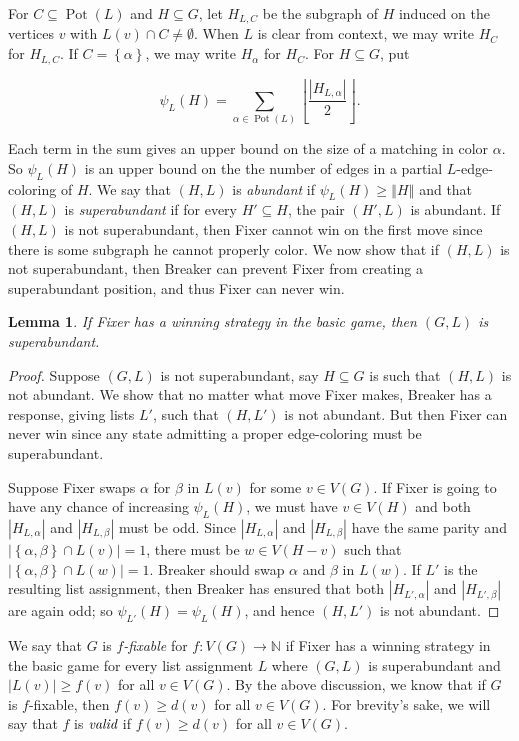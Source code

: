 \documentclass[12pt,reqno]{amsart}
\theoremstyle{plain}
\newtheorem{lem}[thm]{Lemma}
\theoremstyle{definition}
\theoremstyle{remark}
\newcommand{\IN}{\mathbb{N}}
\newcommand{\set}[1]{\left\{ #1 \right\}}
\newcommand{\card}[1]{\left|#1\right|}
\newcommand{\size}[1]{\left\Vert#1\right\Vert}
\newcommand{\floor}[1]{\left\lfloor#1\right\rfloor}
\newcommand{\func}[3]{#1\colon #2 \rightarrow #3}
\newcommand{\pot}{\operatorname{Pot}}
\begin{document}
\bigskip
\noindent 
For $C \subseteq \pot(L)$ and $H \subseteq G$, let $H_{L, C}$ be the
subgraph of $H$ induced on the vertices $v$ with $L(v) \cap C \ne \emptyset$. 
When $L$ is clear from context, we may write $H_C$ for $H_{L,C}$. If $C =
\set{\alpha}$, we may write $H_\alpha$ for $H_C$.  For $H \subseteq G$, put

\[\psi_L(H) = \sum_{\alpha \in \pot(L)} \floor{\frac{\card{H_{L, \alpha}}}{2}}.\]

Each term in the sum gives an upper bound on the size of a matching in color
$\alpha$. So $\psi_L(H)$ is an upper bound on the the number of edges in a
partial $L$-edge-coloring of $H$.  We say that $(H, L)$ is \emph{abundant} if
$\psi_L(H) \ge \size{H}$ and that $(H,L)$ is \emph{superabundant} if for every
$H' \subseteq H$, the pair $(H', L)$ is abundant.  If $(H, L)$ is not
superabundant, then Fixer cannot win on the first move since there is some
subgraph he cannot properly color.  We now show that if $(H, L)$ is not
superabundant, then Breaker can prevent Fixer from creating a superabundant
position, and thus Fixer can never win.

\begin{lem}\label{Necessity}
If Fixer has a winning strategy in the basic game, then $(G, L)$ is superabundant.
\end{lem}
\begin{proof}
Suppose $(G, L)$ is not superabundant, say $H \subseteq G$ is such that $(H,
L)$ is not abundant.  We show that no matter what move Fixer makes, Breaker has
a response, giving lists $L'$, such that $(H, L')$ is not abundant.  But then
Fixer can never win since any state admitting a proper edge-coloring must be
superabundant.

Suppose Fixer swaps $\alpha$ for $\beta$ in $L(v)$ for some $v \in V(G)$.  If
Fixer is going to have any chance of increasing $\psi_L(H)$, we must have $v
\in V(H)$ and both $\card{H_{L, \alpha}}$ and $\card{H_{L, \beta}}$ must be
odd.  Since $\card{H_{L, \alpha}}$ and $\card{H_{L, \beta}}$ have the same
parity and $\card{\set{\alpha, \beta} \cap L(v)} = 1$, there must be $w \in V(H
- v)$ such that $\card{\set{\alpha, \beta} \cap L(w)} = 1$. Breaker should swap
$\alpha$ and $\beta$ in $L(w)$.  If $L'$ is the resulting list assignment,
then Breaker has ensured that both $\card{H_{L', \alpha}}$ and $\card{H_{L',
\beta}}$ are again odd; so $\psi_{L'}(H)=\psi_L(H)$, and hence $(H, L')$ is not
abundant. 
\end{proof}

We say that $G$ is \emph{$f$-fixable} for $\func{f}{V(G)}{\IN}$ if Fixer has a winning strategy in the basic game for every list assignment $L$ where $(G, L)$ is superabundant and $\card{L(v)} \ge f(v)$ for all $v \in V(G)$.  By the above discussion, we know that if $G$ is $f$-fixable, then $f(v) \ge d(v)$ for all $v \in V(G)$.  For brevity's sake, we will say that $f$ is $\emph{valid}$ if $f(v) \ge d(v)$ for all $v \in V(G)$.
\end{document}
